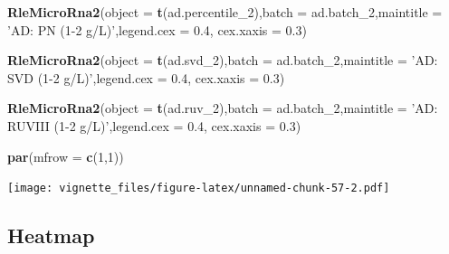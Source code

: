 \documentclass[]{book}
\newenvironment{Shaded}{\begin{snugshade}}{\end{snugshade}}
\newcommand{\KeywordTok}[1]{\textcolor[rgb]{0.13,0.29,0.53}{\textbf{#1}}}
\newcommand{\DataTypeTok}[1]{\textcolor[rgb]{0.13,0.29,0.53}{#1}}
\newcommand{\DecValTok}[1]{\textcolor[rgb]{0.00,0.00,0.81}{#1}}
\newcommand{\FloatTok}[1]{\textcolor[rgb]{0.00,0.00,0.81}{#1}}
\newcommand{\StringTok}[1]{\textcolor[rgb]{0.31,0.60,0.02}{#1}}
\newcommand{\NormalTok}[1]{#1}
\begin{document}
\begin{Shaded}
\begin{Highlighting}[]
\KeywordTok{RleMicroRna2}\NormalTok{(}\DataTypeTok{object =} \KeywordTok{t}\NormalTok{(ad.percentile_}\DecValTok{2}\NormalTok{),}\DataTypeTok{batch =}\NormalTok{ ad.batch_}\DecValTok{2}\NormalTok{,}\DataTypeTok{maintitle =} \StringTok{'AD: PN (1-2 g/L)'}\NormalTok{,}\DataTypeTok{legend.cex =} \FloatTok{0.4}\NormalTok{, }\DataTypeTok{cex.xaxis =} \FloatTok{0.3}\NormalTok{)}

\KeywordTok{RleMicroRna2}\NormalTok{(}\DataTypeTok{object =} \KeywordTok{t}\NormalTok{(ad.svd_}\DecValTok{2}\NormalTok{),}\DataTypeTok{batch =}\NormalTok{ ad.batch_}\DecValTok{2}\NormalTok{,}\DataTypeTok{maintitle =} \StringTok{'AD: SVD (1-2 g/L)'}\NormalTok{,}\DataTypeTok{legend.cex =} \FloatTok{0.4}\NormalTok{, }\DataTypeTok{cex.xaxis =} \FloatTok{0.3}\NormalTok{)}

\KeywordTok{RleMicroRna2}\NormalTok{(}\DataTypeTok{object =} \KeywordTok{t}\NormalTok{(ad.ruv_}\DecValTok{2}\NormalTok{),}\DataTypeTok{batch =}\NormalTok{ ad.batch_}\DecValTok{2}\NormalTok{,}\DataTypeTok{maintitle =} \StringTok{'AD: RUVIII (1-2 g/L)'}\NormalTok{,}\DataTypeTok{legend.cex =} \FloatTok{0.4}\NormalTok{, }\DataTypeTok{cex.xaxis =} \FloatTok{0.3}\NormalTok{)}

\KeywordTok{par}\NormalTok{(}\DataTypeTok{mfrow =} \KeywordTok{c}\NormalTok{(}\DecValTok{1}\NormalTok{,}\DecValTok{1}\NormalTok{))}
\end{Highlighting}
\end{Shaded}

\texttt{[image: vignette\_files/figure-latex/unnamed-chunk-57-2.pdf]}

\subsection{Heatmap}\label{heatmap-1}
\end{document}
